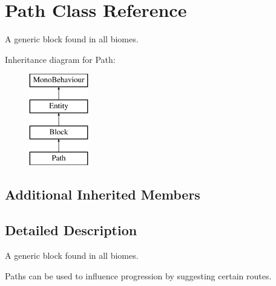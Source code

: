 \hypertarget{class_path}{}\section{Path Class Reference}
\label{class_path}


A generic block found in all biomes.  


Inheritance diagram for Path\+:\begin{figure}[H]
\begin{center}
\leavevmode
\includegraphics[height=4.000000cm]{class_path}
\end{center}
\end{figure}
\subsection*{Additional Inherited Members}


\subsection{Detailed Description}
A generic block found in all biomes. 

Paths can be used to influence progression by suggesting certain routes. 